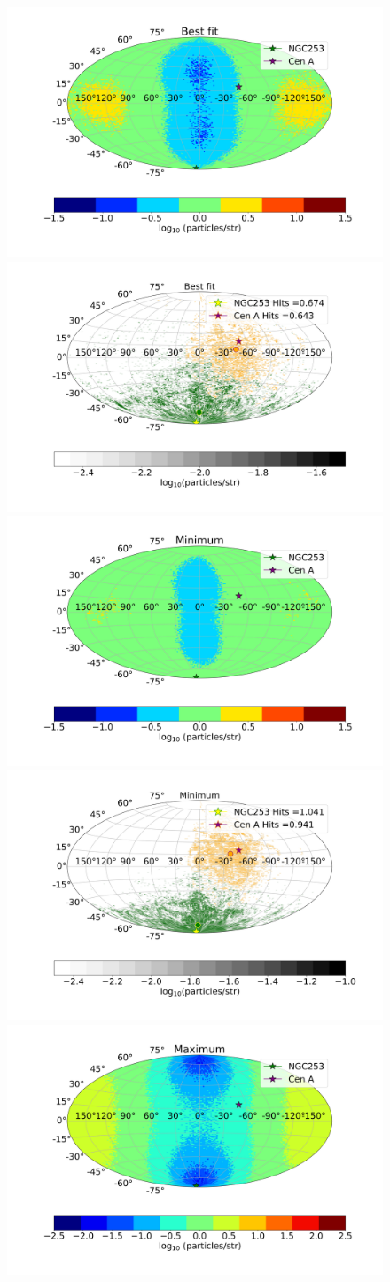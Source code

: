 \documentclass[usenatbib]{mnras}
\begin{document}
\begin{figure}
\centering
\includegraphics[width=0.49\linewidth]{Images/Log_Bins_180_Historgam_BF_N2_Str_Tur_TM_40_EeV.png}
\includegraphics[width=0.49\linewidth]{Images/Bins_180_BF_N2_CenA_NGC253_Str_Tur_TM_40_EeV.png}\\
\includegraphics[width=0.49\linewidth]{Images/Log_Bins_180_Historgam_LB_N2_Str_Tur_TM_40_EeV.png}
\includegraphics[width=0.49\linewidth]{Images/Bins_180_LB_N2_CenA_NGC253_Str_Tur_TM_40_EeV.png}\\
\includegraphics[width=0.49\linewidth]{Images/Log_Bins_180_Historgam_UB_N2_Str_Tur_TM_40_EeV.png}

\end{figure}
\end{document}
